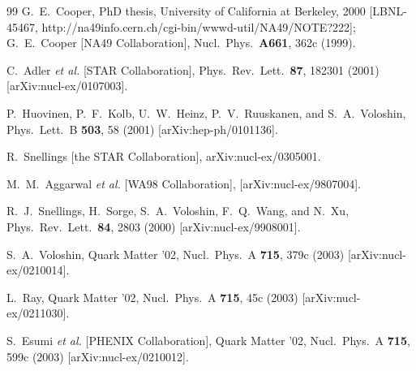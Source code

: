 \documentclass[aps,prc,superscriptaddress,showpacs,floatfix,nofootinbib]{revtex4}
\begin{document}
\begin{thebibliography}{99}
G.~E.~Cooper, 
PhD thesis, University of California at Berkeley, 2000 
[LBNL-45467, http://na49info.cern.ch/cgi-bin/wwwd-util/NA49/NOTE?222];
G.~E.~Cooper [NA49 Collaboration], 
Nucl.\ Phys.\  {\bf A661}, 362c (1999).

C.~Adler {\it et al.}  [STAR Collaboration], 
Phys.\ Rev.\ Lett.\  {\bf 87}, 182301 (2001)
[arXiv:nucl-ex/0107003].

P.~Huovinen, P.~F.~Kolb, U.~W.~Heinz, P.~V.~Ruuskanen, and S.~A.~Voloshin,
Phys.\ Lett.\ B {\bf 503}, 58 (2001)
[arXiv:hep-ph/0101136].

R.~Snellings  [the STAR Collaboration],
arXiv:nucl-ex/0305001.

M.~M.~Aggarwal {\it et al.}  [WA98 Collaboration],
[arXiv:nucl-ex/9807004].

R.~J.~Snellings, H.~Sorge, S.~A.~Voloshin, F.~Q.~Wang, and N.~Xu,
Phys.\ Rev.\ Lett.\  {\bf 84}, 2803 (2000)
[arXiv:nucl-ex/9908001].

S.~A.~Voloshin,
Quark Matter '02, Nucl.\ Phys.\ A {\bf 715}, 379c (2003) 
[arXiv:nucl-ex/0210014].

L.~Ray,
Quark Matter '02, Nucl.\ Phys.\ A {\bf 715}, 45c (2003) 
[arXiv:nucl-ex/0211030].

S.~Esumi {\it et al.}  [PHENIX Collaboration],
Quark Matter '02, Nucl.\ Phys.\ A {\bf 715}, 599c (2003) 
[arXiv:nucl-ex/0210012].


\end{thebibliography}
\end{document}
